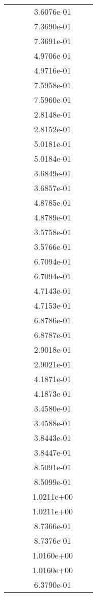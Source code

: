 \begin{xltabular}{\textwidth}{r|rS[table-format=1.3e+2]S[table-format=1.4e+2]S[table-format=1.4e+2]S[table-format=-1.5]}
&  &  & 3.6076e-01 & & \\
&  &  & 7.3690e-01 & & \\
&  &  & 7.3691e-01 & & \\
&  &  & 4.9706e-01 & & \\
&  &  & 4.9716e-01 & & \\
&  &  & 7.5958e-01 & & \\
&  &  & 7.5960e-01 & & \\
&  &  & 2.8148e-01 & & \\
&  &  & 2.8152e-01 & & \\
&  &  & 5.0181e-01 & & \\
&  &  & 5.0184e-01 & & \\
&  &  & 3.6849e-01 & & \\
&  &  & 3.6857e-01 & & \\
&  &  & 4.8785e-01 & & \\
&  &  & 4.8789e-01 & & \\
&  &  & 3.5758e-01 & & \\
&  &  & 3.5766e-01 & & \\
&  &  & 6.7094e-01 & & \\
&  &  & 6.7094e-01 & & \\
&  &  & 4.7143e-01 & & \\
&  &  & 4.7153e-01 & & \\
&  &  & 6.8786e-01 & & \\
&  &  & 6.8787e-01 & & \\
&  &  & 2.9018e-01 & & \\
&  &  & 2.9021e-01 & & \\
&  &  & 4.1871e-01 & & \\
&  &  & 4.1873e-01 & & \\
&  &  & 3.4580e-01 & & \\
&  &  & 3.4588e-01 & & \\
&  &  & 3.8443e-01 & & \\
&  &  & 3.8447e-01 & & \\
&  &  & 8.5091e-01 & & \\
&  &  & 8.5099e-01 & & \\
&  &  & 1.0211e+00 & & \\
&  &  & 1.0211e+00 & & \\
&  &  & 8.7366e-01 & & \\
&  &  & 8.7376e-01 & & \\
&  &  & 1.0160e+00 & & \\
&  &  & 1.0160e+00 & & \\
&  &  & 6.3790e-01 & & \\

\end{xltabular}
